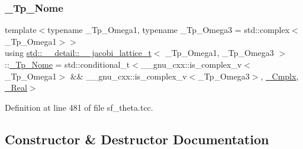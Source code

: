 \subsubsection{\texorpdfstring{\+\_\+\+Tp\+\_\+\+Nome}{\_Tp\_Nome}}
{\footnotesize\ttfamily template$<$typename \+\_\+\+Tp\+\_\+\+Omega1, typename \+\_\+\+Tp\+\_\+\+Omega3 = std\+::complex$<$\+\_\+\+Tp\+\_\+\+Omega1$>$$>$ \\
using \hyperlink{structstd_1_1____detail_1_1____jacobi__lattice__t}{std\+::\+\_\+\+\_\+detail\+::\+\_\+\+\_\+jacobi\+\_\+lattice\+\_\+t}$<$ \+\_\+\+Tp\+\_\+\+Omega1, \+\_\+\+Tp\+\_\+\+Omega3 $>$\+::\hyperlink{structstd_1_1____detail_1_1____jacobi__lattice__t_a0de534a75abb780f607e9d3cd8b84e42}{\+\_\+\+Tp\+\_\+\+Nome} =  std\+::conditional\+\_\+t$<$\+\_\+\+\_\+gnu\+\_\+cxx\+::is\+\_\+complex\+\_\+v$<$\+\_\+\+Tp\+\_\+\+Omega1$>$ \&\& \+\_\+\+\_\+gnu\+\_\+cxx\+::is\+\_\+complex\+\_\+v$<$\+\_\+\+Tp\+\_\+\+Omega3$>$, \hyperlink{structstd_1_1____detail_1_1____jacobi__lattice__t_a77e286c37544d6ba5e4fb5542d3aad5f}{\+\_\+\+Cmplx}, \hyperlink{structstd_1_1____detail_1_1____jacobi__lattice__t_afdf4a474bd195f7b6062b4782202adc7}{\+\_\+\+Real}$>$}



Definition at line 481 of file sf\+\_\+theta.\+tcc.



\subsection{Constructor \& Destructor Documentation}
\mbox{\label{structstd_1_1____detail_1_1____jacobi__lattice__t_a60eb3027f7b2e1a59154f36a720bb366}} 
